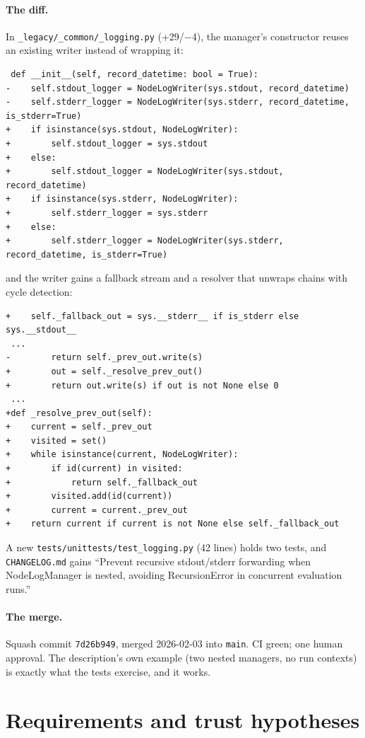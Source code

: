 \documentclass[11pt,a4paper]{article}
\newcommand{\code}[1]{\texttt{#1}}
\begin{document}
\paragraph{The diff.} In \code{\_legacy/\_common/\_logging.py} (+29/$-$4), the manager's constructor reuses an existing writer instead of wrapping it:
\begin{lstlisting}
 def __init__(self, record_datetime: bool = True):
-    self.stdout_logger = NodeLogWriter(sys.stdout, record_datetime)
-    self.stderr_logger = NodeLogWriter(sys.stderr, record_datetime, is_stderr=True)
+    if isinstance(sys.stdout, NodeLogWriter):
+        self.stdout_logger = sys.stdout
+    else:
+        self.stdout_logger = NodeLogWriter(sys.stdout, record_datetime)
+    if isinstance(sys.stderr, NodeLogWriter):
+        self.stderr_logger = sys.stderr
+    else:
+        self.stderr_logger = NodeLogWriter(sys.stderr, record_datetime, is_stderr=True)
\end{lstlisting}
and the writer gains a fallback stream and a resolver that unwraps chains with cycle detection:
\begin{lstlisting}
+    self._fallback_out = sys.__stderr__ if is_stderr else sys.__stdout__
 ...
-        return self._prev_out.write(s)
+        out = self._resolve_prev_out()
+        return out.write(s) if out is not None else 0
 ...
+def _resolve_prev_out(self):
+    current = self._prev_out
+    visited = set()
+    while isinstance(current, NodeLogWriter):
+        if id(current) in visited:
+            return self._fallback_out
+        visited.add(id(current))
+        current = current._prev_out
+    return current if current is not None else self._fallback_out
\end{lstlisting}
A new \code{tests/unittests/test\_logging.py} (42 lines) holds two tests, and \code{CHANGELOG.md} gains ``Prevent recursive stdout/stderr forwarding when NodeLogManager is nested, avoiding RecursionError in concurrent evaluation runs.''

\paragraph{The merge.} Squash commit \code{7d26b949}, merged 2026-02-03 into \code{main}. CI green; one human approval. The description's own example (two nested managers, no run contexts) is exactly what the tests exercise, and it works.

\section{Requirements and trust hypotheses}
\label{sec:hyp}
\end{document}
